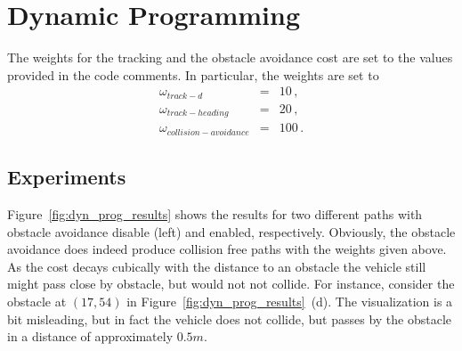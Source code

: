 
\section{Dynamic Programming}
The weights for the tracking and the obstacle avoidance cost are set to the values provided in the code comments.
In particular, the weights are set to
\begin{eqnarray}
	\omega_{track-d} &=& 10\, ,\\
	\omega_{track-heading} &=& 20\, ,\\
	\omega_{collision-avoidance} &=& 100 \, .
\end{eqnarray}
\subsection{Experiments}
Figure~\ref{fig:dyn_prog_results} shows the results for two different paths with obstacle avoidance disable (left) and enabled, respectively.
Obviously, the obstacle avoidance does indeed produce collision free paths with the weights given above.
As the cost decays cubically with the distance to an obstacle the vehicle still might pass close by obstacle, but would not not collide.
For instance, consider the obstacle at $(17, 54)$ in Figure~\ref{fig:dyn_prog_results}~(d).
The visualization is a bit misleading, but in fact the vehicle does not collide, but passes by the obstacle in a distance of approximately $0.5m$.

